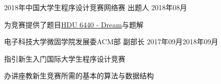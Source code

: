
\begin{projitem}
    {2018年中国大学生程序设计竞赛网络赛}
    {出题人}
    {2018年08月}{}
    \item 为竞赛提供了题目\href{http://acm.hdu.edu.cn/showproblem.php?pid=6440}{HDU 6440 - Dream}与题解
\end{projitem}

\begin{projitem}
    {电子科技大学微固学院发展委ACM部}
    {副部长}
    {2017年09月}{2018年09月}
    \item 指引新生入门国际大学生程序设计竞赛
    \item 办讲座教新生竞赛所需的基本的算法与数据结构
\end{projitem}

\endinput